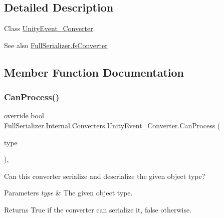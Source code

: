\subsection{Detailed Description}
Class \hyperlink{class_full_serializer_1_1_internal_1_1_converters_1_1_unity_event___converter}{Unity\+Event\+\_\+\+Converter}. 

\begin{DoxySeeAlso}{See also}
\hyperlink{class_full_serializer_1_1fs_converter}{Full\+Serializer.\+fs\+Converter}


\end{DoxySeeAlso}


\subsection{Member Function Documentation}
\mbox{\label{class_full_serializer_1_1_internal_1_1_converters_1_1_unity_event___converter_a98db577455b325edf5035170c6297474}} 
\subsubsection{\texorpdfstring{Can\+Process()}{CanProcess()}}
{\footnotesize\ttfamily override bool Full\+Serializer.\+Internal.\+Converters.\+Unity\+Event\+\_\+\+Converter.\+Can\+Process (\begin{DoxyParamCaption}\item[{Type}]{type }\end{DoxyParamCaption})\hspace{0.3cm}{\ttfamily [inline]}, {\ttfamily [virtual]}}



Can this converter serialize and deserialize the given object type? 


\begin{DoxyParams}{Parameters}
{\em type} & The given object type.\\
\hline
\end{DoxyParams}
\begin{DoxyReturn}{Returns}
True if the converter can serialize it, false otherwise.
\end{DoxyReturn}


